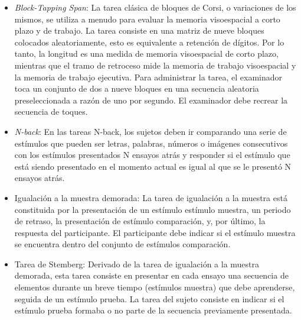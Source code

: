 \documentclass[12pt,letterpaper,final]{article}
\begin{document}
\begin{itemize}
	\item \textit{Block-Tapping Span}:
	La tarea clásica de bloques de Corsi, o variaciones de los mismos, se utiliza a menudo para evaluar la memoria visoespacial a corto plazo y de trabajo. La tarea consiste en una matriz de nueve bloques colocados aleatoriamente, esto es equivalente a retención de dígitos. Por lo tanto, la longitud es una medida de memoria visoespacial de corto plazo, mientras que el tramo de retroceso mide la memoria de trabajo visoespacial y la memoria de trabajo ejecutiva. Para administrar la tarea, el examinador toca un conjunto de dos a nueve bloques en una secuencia aleatoria preseleccionada a razón de uno por segundo. El examinador debe recrear la secuencia de toques.

\item \textit{N-back}:
	En las tareas N-back, los sujetos deben ir comparando
	una serie de estímulos que pueden ser letras, palabras, números o imágenes consecutivos con los estímulos presentados N ensayos
	atrás y responder si el estímulo que está siendo presentado en el momento actual es igual al que se le presentó N ensayos atrás.

	
	\item Igualación a la muestra demorada:
	La tarea de igualación a la muestra está constituida por la presentación de un estímulo estímulo muestra, un periodo de retraso, la presentación de estímulo comparación, y, por último, la respuesta del participante. El participante debe indicar si el estímulo muestra se encuentra dentro del conjunto de estímulos comparación.

	\item Tarea de Stemberg:
Derivado de la tarea de igualación a la muestra demorada, esta tarea consiste en presentar en cada ensayo una secuencia de elementos durante un breve tiempo (estímulos muestra) que debe aprenderse, seguida de un estímulo prueba. La tarea del sujeto consiste en indicar si el estímulo prueba formaba o no parte de la secuencia previamente presentada. 
\end{itemize}
\end{document}
